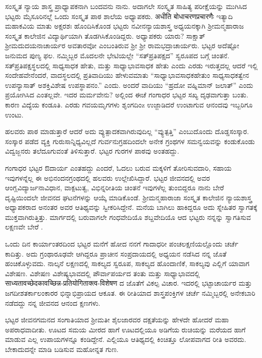 ಸಂಸ್ಕೃತ ನ್ಯಾಯ ಶಾಸ್ತ್ರ ಪ್ರಾಧ್ಯಾಪಕನಾಗಿ ಬಂದವನು ನಾನು. ಅದಾಗಲೇ ಸಂಸ್ಕೃತ ಸಾಹಿತ್ಯ ಪರೀಕ್ಷೆಯನ್ನು ಮುಗಿಸಿದ ಭಟ್ಟರು ಮೈಸೂರಿನಲ್ಲೆ ಒಂದು ಸಂಸ್ಕೃತ ಪಾಠ ಶಾಲೆಯ ಅಧ್ಯಾಪಕರು. अधीति बोधाचरणप्रचारणैः ಇತ್ಯಾದಿ ಮಹಾಕವಿಯ ಮಾತು ಅಕ್ಷರಶಃ ಹೊಂದಿಸಿಕೊಂಡ ಭಟ್ಟರು ನವೀನನ್ಯಾಯಶಾಸ್ತ್ರ ಅಧ್ಯಯನಕ್ಕಾಗಿ ಶ್ರೀಮನ್ಮಹಾರಾಜ ಸಂಸ್ಕೃತ ಕಾಲೇಜಿನ ವಿದ್ಯಾರ್ಥಿಯಾಗಿ ತೊಡಗಿಸಿಕೊಂಡಿದ್ದರು. ಅಧ್ಯಾಪಕರು ಯಾರು? ಸಾಕ್ಷಾತ್ ಶ್ರೀಮದುದಯನಾಚಾರ್ಯರ ಅವತಾರವೋ ಎಂಬಂತಿರುವ ಶ್ರೀ ಶ್ರೀ ರಾಮಭದ್ರಾಚಾರ್ಯರು. ಭಟ್ಟರ ಅದೆಷ್ಟೋ ಜನುಮದ ಪುಣ್ಯ ಫಲ. ನಮ್ಮಿಬ್ಬರ ಮೊದಲನೇ ಭೇಟಿಯಲ್ಲೇ “ಸತ್‍ಪ್ರತಿಪಕ್ಷದ” ಸ್ವರೂಪದ ಬಗ್ಗೆ ಚಿಂತನೆ. ಸತ್‍ಪ್ರತಿಪಕ್ಷಸ್ಥಲದಲ್ಲಿ ಸಾಧ್ಯಸಾಧಕ ಹೇತು, ಮತ್ತು ಸಾಧ್ಯಾಭಾವಸಾಧಕ ಹೇತು ಎಂದು ಎರಡು ಇರುತ್ತದಲ್ಲ ಆದರೆ ಇಲ್ಲಿ ಸಂದೇಹವೇನೆಂದರೆ, ವಾದಸ್ಥಲದಲ್ಲಿ ಪ್ರತಿವಾದಿಯು ಹೇಳುವಮಾತು “ಸಾಧ್ಯಾಭಾವಸಾಧಕಹೇತುಂ ಸಾಧ್ಯಸಾಧಕತ್ವೇನ ಉಪನ್ಯಾಸಾತ್ ಅಶಕ್ತಿವಿಶೇಷ ಉಪಸ್ಥಾಪನಂ.” ಎಂದು. ಅಂದರೆ ವಾದಿಯು “ಹ್ರದೋ ವಹ್ನಿಮಾನ್ ಜಲಾತ್” ಎಂದು ಪ್ರಯೋಗಿಸಿದ ಎಂತಲ್ಲವೇ. ಇದರ ಮರ್ಮವೇನು? ಅಲ್ಲಿಂದ ಈಚೆ ಗಂಗಾಧರ ಭಟ್ಟರ ಸಖ್ಯ ದೃಢವಾಗುತ್ತಾ ಬಂತು. ಕಾರಣ ವಿದ್ಯೆಯ ಕಂಡೂತಿ. ಎರಡು ಗವಯಮೃಗಗಳು ಶೃಂಗದಿಂz  ಉಜ್ಜಾಡಿದರೆ ಉಂಟಾಗುವ ಆನಂದವು ಇಬ್ಬರಿಗೂ ಉಂಟು.

ಹಲವರು ಪಾಠ ಮಾಡುತ್ತಾರೆ ಆದರೆ ಅದು ವ್ಯುತ್ಪಾದಕವಾಗಿರುವುದಿಲ್ಲ “ವ್ಯುತ್ಪತ್ತಿ” ಎಂಬುದೊಂದು ದೊಡ್ಡಸಂಸ್ಕಾರ. ಸಂಸ್ಕಾರ ಪಡೆದ ವ್ಯಕ್ತಿ ಗುರುಸಾನ್ನಿಧ್ಯವಿಲ್ಲದೆ ಗುರ್ವನುಗ್ರಹದಿಂದಲೇ ಅನೇಕ ಗ್ರಂಥಗಳ ಸಮನ್ವಯವನ್ನು ಕಂಡುಕೊಂಡು ವಿದ್ವಜ್ಜನರು ತಲೆದೂಗುವಂತೆ ತಿಳಿಸುತ್ತಾರೆ. ಭಟ್ಟರ ಗುರಗಳ ಪಾಠವು ಅಂತಹದ್ದು.

ಗಂಗಾಧರ ಭಟ್ಟರ  ಔದಾರ್ಯ ಎಂತಹದ್ದು ಎಂದರೆ, ಓದಲು ಬರುವ ಮಕ್ಕಳಿಗೆ ತೋರಿಸುವದಾರಿ, ಸಹಾಯ ಇವುಗಳನ್ನೆಲ್ಲ ಈ ಅಭಿನಂದನಗ್ರಂಥದಲ್ಲಿ ಹಲವರು ಉಲ್ಲೇಖಿಸಿದ್ದಾರೆ. ಭಟ್ಟರ ಜೀವನದಲ್ಲಿ ಅವರ ಆಂಗ್ಲವಿದ್ಯಾರ್ಜನಾವಿಧಾನ, ವಾಕ್ಪಟುತ್ವ, ವಿಭಿನ್ನರೀತಿಯ ಚಿಂತನೆ ಇವುಗಳೆಲ್ಲ ತುಂಬಿದ್ದರೂ ನಾನು ಬೇರೆ ದೃಷ್ಟಿಯಿಂದಲೇ ಜೀವನದ ಘಟನೆಗಳನ್ನು ಆಯ್ಕೆ ಮಾಡಿಕೊಂಡೆ. ಶ್ರೀಮನ್ಮಹಾರಾಜಾ ಸಂಸ್ಕೃತ ಕಾಲೇಜಿನ ನ್ಯಾಯಶಾಸ್ತ್ರ ಅಧ್ಯಾಪಕರಾದ ಅನಂತರ ಅವರ ಆತಿಥ್ಯವನ್ನು ಸ್ವೀಕರಿಸಿದ್ದೇನೆ. ಮನೆಯ ಬಾಗಿಲು ಹಾಕಿದ್ದರೂ ಅದು ಸ್ನೇಹಿತರ ಸ್ವಾಗತಕ್ಕೆ ಮುಕ್ತವಾಗಿರುತ್ತಿತ್ತು. ಮಾರ್ಗದಲ್ಲಿ ಬರುವಾಗಲೇ ಗಂಧವೇದಿಯೊ ಶಬ್ದವೇದಿಯೊ ಆದ ಭಟ್ಟರು ನನ್ನನ್ನು ಸ್ವಾಗತಿಸುವ ಲಕ್ಷಣವೇ ಬೇರೆ .

ಒಂದು ದಿನ ಕಾರ್ಯಾಂತರದಿಂದ ಭಟ್ಟರ ಮನೆಗೆ ಹೋದ ನನಗೆ ಗಾದಾಧರೀ ಪಂಚಲಕ್ಷಣಿಯಲ್ಲೊಂದು ಚರ್ಚೆ ಕಾದಿತ್ತು. ಅದು ಗ್ರಂಥಾರೂಢವೇ ಆಗಿದ್ದರೂ ಪ್ರಾಚೀನ ಸಂಪ್ರದಾಯದಲ್ಲಿ ಅಧ್ಯಯನ ನಡೆಸಿದ ನನ್ನ ಜೊತೆ ಹಂಚಿಕೊಳ್ಳುವದು. ನಾಲ್ಕನೆ ಲಕ್ಷಣದಲ್ಲಿ ಸಾಕಲ್ಯದ ಸ್ವರೂಪ, ಸಾಕಲ್ಯದ ಹೊಂದಾಣಿಕೆ, ಸಾಕಲ್ಯವು ಎಲ್ಲಿಗೆ ಯಾವಾಗ ವಿಶೇಷಣ. ವಿಶೇಷಣ ವಿಶೇಷ್ಯಭಾವದಲ್ಲಿ ಪೌರ್ವಾಪರ್ಯದ ತಂತು ಮತ್ತು ಸಾಧ್ಯಾಭಾವದಲ್ಲಿ साध्यतावच्छेदकावच्छिन्न-प्रतियोगिताक्त्व-विशेषण ದ ಜೊತೆಗೆ ವಿಕಲ್ಪ ವಿಚಾರ. ಇದರಲ್ಲಿ ಭಟ್ಟಾಚಾರ್ಯರ ಮತ್ತು ಜಗದೀಶತರ್ಕಾಲಂಕಾರರ ಭಿನ್ನಾಭಿಪ್ರಾಯದ ಆಕೂತ. ಈ ರೀತಿಯಾದ ಶಾಸ್ತ್ರಪಂಕ್ತಿಗಳ ಚರ್ಚೆ ನಮ್ಮಿಬ್ಬರಲ್ಲಿ ಅನೇಕಬಾರಿ ನಡೆದದ್ದು ನನ್ನ ಜೀವನದ ಆನಂದ ಕ್ಷಣಗಳು.

ಭಟ್ಟರ ಜೀವನಗಮನದ ಸಂಗಾತಿಯಾದ ಶ್ರೀಮತೀ ಶೈಲಜಾರವರ ದಕ್ಷತೆಯನ್ನು ಹೇಳದೇ ಹೋದರೆ ಮಹಾ ಅಪರಾಧವಾದೀತು. ಊಟದ ಸಮಯ ಮೀರದ ಹಾಗೆ ಊಟದಲ್ಲಿಯೂ ಅಡಿಗೆಯ ರುಚಿಯನ್ನು ಮರೆಯದ ಹಾಗೆ ಮಾಡುವ ಎಲ್ಲ ಉಪಾಯಗಳನ್ನೂ ಕಂಡಿದ್ದೇನೆ. ಎಲ್ಲಿಯೂ ಆತಿಥ್ಯದಲ್ಲಿ ಕಿಂಚಿತ್ತೂ ಲೋಪವಾಗದ ರೀತಿ ಅವರದು. ಬೇಕಾದುದನ್ನೇ ಮಾಡಿ ಬಡಿಸುವ ಮಹೋನ್ನತ ಗುಣ.


